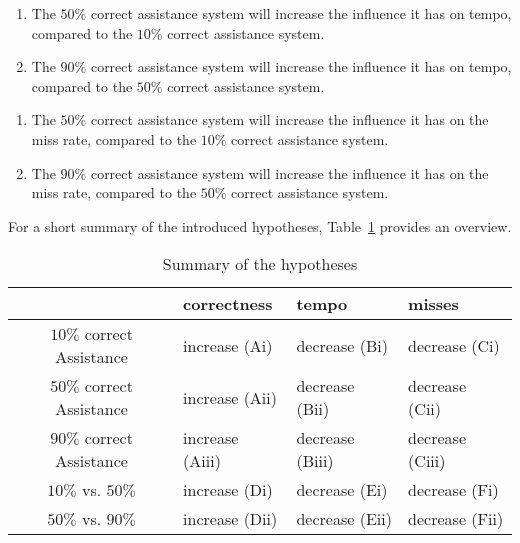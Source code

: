 		\begin{enumerate}[{E}i)]
			\item The \(50\%\) correct assistance system will increase the influence it has on tempo, compared to the \(10\%\) correct assistance system.
			\item The \(90\%\) correct assistance system will increase the influence it has on tempo, compared to the \(50\%\) correct assistance system.
		\end{enumerate}
		\vspace{0.5cm}

		\begin{enumerate}[{F}i)]
			\item The \(50\%\) correct assistance system will increase the influence it has on the miss rate, compared to the \(10\%\) correct assistance system.
			\item The \(90\%\) correct assistance system will increase the influence it has on the miss rate, compared to the \(50\%\) correct assistance system.
		\end{enumerate}

		\vspace{0.5cm}
		For a short summary of the introduced hypotheses, Table~\ref{tab:Hypotheses} provides an overview.

		\begin{table}[H]\centering
			\caption{Summary of the hypotheses}
			\begin{tabular}{clll}
				\toprule
				& correctness & tempo & misses \\
				\midrule
				$10\%$ correct Assistance & increase (Ai) & decrease (Bi) & decrease (Ci) \\
				$50\%$ correct Assistance & increase (Aii) & decrease (Bii) & decrease (Cii) \\
				$90\%$ correct Assistance & increase (Aiii) & decrease (Biii) & decrease (Ciii) \\
				$10\%$ vs. $50\%$ & increase (Di) & decrease (Ei) & decrease (Fi) \\
				$50\%$ vs. $90\%$ & increase (Dii) & decrease (Eii) & decrease (Fii) \\
				\bottomrule
			\end{tabular}
			\label{tab:Hypotheses}
		\end{table}
